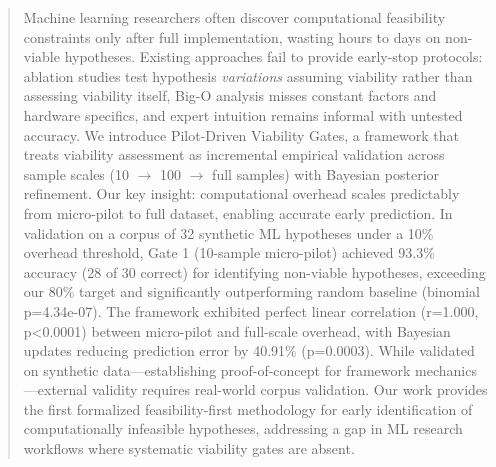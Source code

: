 \begin{abstract}
Machine learning researchers often discover computational feasibility constraints only after full implementation, wasting hours to days on non-viable hypotheses. Existing approaches fail to provide early-stop protocols: ablation studies test hypothesis \textit{variations} assuming viability rather than assessing viability itself, Big-O analysis misses constant factors and hardware specifics, and expert intuition remains informal with untested accuracy. We introduce Pilot-Driven Viability Gates, a framework that treats viability assessment as incremental empirical validation across sample scales (10 $\rightarrow$ 100 $\rightarrow$ full samples) with Bayesian posterior refinement. Our key insight: computational overhead scales predictably from micro-pilot to full dataset, enabling accurate early prediction. In validation on a corpus of 32 synthetic ML hypotheses under a 10\% overhead threshold, Gate 1 (10-sample micro-pilot) achieved 93.3\% accuracy (28 of 30 correct) for identifying non-viable hypotheses, exceeding our 80\% target and significantly outperforming random baseline (binomial p=4.34e-07). The framework exhibited perfect linear correlation (r=1.000, p<0.0001) between micro-pilot and full-scale overhead, with Bayesian updates reducing prediction error by 40.91\% (p=0.0003). While validated on synthetic data---establishing proof-of-concept for framework mechanics---external validity requires real-world corpus validation. Our work provides the first formalized feasibility-first methodology for early identification of computationally infeasible hypotheses, addressing a gap in ML research workflows where systematic viability gates are absent.
\end{abstract}
